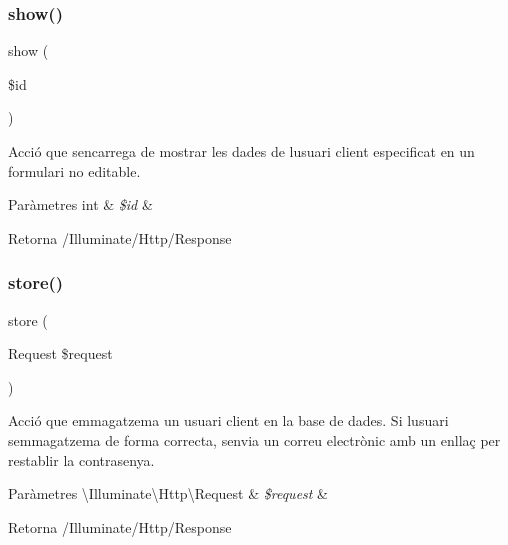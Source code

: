 \subsubsection{\texorpdfstring{show()}{show()}}
{\footnotesize\ttfamily show (\begin{DoxyParamCaption}\item[{}]{\$id }\end{DoxyParamCaption})}

Acció que s\textquotesingle{}encarrega de mostrar les dades de l\textquotesingle{}usuari client especificat en un formulari no editable.


\begin{DoxyParams}[1]{Paràmetres}
int & {\em \$id} & \\
\hline
\end{DoxyParams}
\begin{DoxyReturn}{Retorna}
/\+Illuminate/\+Http/\+Response 
\end{DoxyReturn}
\mbox{\label{class_app_1_1_http_1_1_controllers_1_1_clients_controller_a9ef485163104597c12185b53cdacf638}} 
\subsubsection{\texorpdfstring{store()}{store()}}
{\footnotesize\ttfamily store (\begin{DoxyParamCaption}\item[{Request}]{\$request }\end{DoxyParamCaption})}

Acció que emmagatzema un usuari client en la base de dades. Si l\textquotesingle{}usuari s\textquotesingle{}emmagatzema de forma correcta, s\textquotesingle{}envia un correu electrònic amb un enllaç per restablir la contrasenya.


\begin{DoxyParams}[1]{Paràmetres}
\textbackslash{}\+Illuminate\textbackslash{}\+Http\textbackslash{}\+Request & {\em \$request} & \\
\hline
\end{DoxyParams}
\begin{DoxyReturn}{Retorna}
/\+Illuminate/\+Http/\+Response 
\end{DoxyReturn}
\mbox{\label{class_app_1_1_http_1_1_controllers_1_1_clients_controller_a27e5c7c270aebe0baec29a042d450df4}} 
